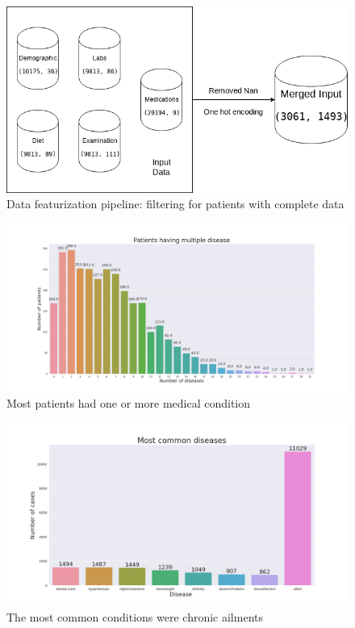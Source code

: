 \documentclass[runningheads]{llncs}
\begin{document}
\begin{figure}[H]
\includegraphics[width=\textwidth,keepaspectratio]{figs/data_preprocessing.png}
\caption{Data featurization pipeline: filtering for patients with complete data}
\label{fig:data_preprocessing}
\centering
\end{figure}

\begin{figure}[H]
\includegraphics[width=\textwidth,keepaspectratio]{figs/image4.png}
\caption{Most patients had one or more medical condition}
\label{fig:patient_disease_profile}
\centering
\end{figure}

\begin{figure}[H]
\includegraphics[width=\textwidth,keepaspectratio]{figs/image12.png}
\caption{The most common conditions were chronic ailments}
\label{fig:common_diseases}
\centering
\end{figure}
\end{document}
